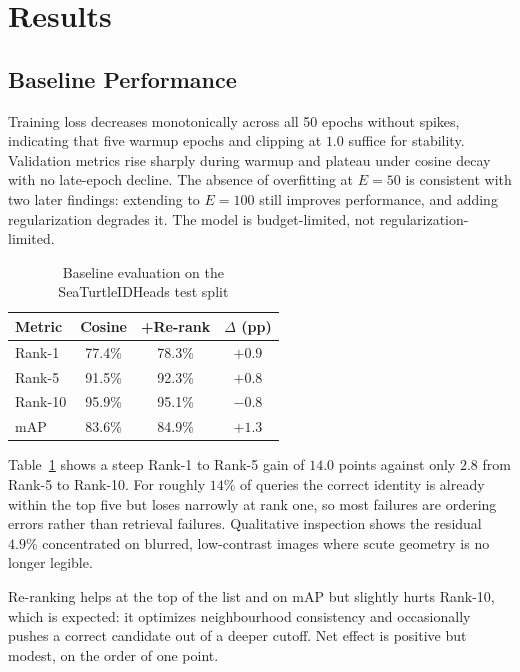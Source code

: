 \documentclass[conference]{IEEEtran}
\begin{document}
\section{Results}

\subsection{Baseline Performance}

Training loss decreases monotonically across all 50 epochs without spikes, indicating
that five warmup epochs and clipping at $1.0$ suffice for stability. Validation metrics
rise sharply during warmup and plateau under cosine decay with no late-epoch decline.
The absence of overfitting at $E=50$ is consistent with two later findings: extending
to $E=100$ still improves performance, and adding regularization degrades it. The model
is budget-limited, not regularization-limited.

\begin{table}[t]
  \caption{Baseline evaluation on the SeaTurtleIDHeads test split}
  \label{tab:baseline_res}
  \centering
  \footnotesize
  \begin{tabular}{@{}lccc@{}}
    \toprule
    \textbf{Metric} & \textbf{Cosine} & \textbf{+Re-rank} & $\Delta$ (pp) \\
    \midrule
    Rank-1          & 77.4\%          & 78.3\%            & $+0.9$        \\
    Rank-5          & 91.5\%          & 92.3\%            & $+0.8$        \\
    Rank-10         & 95.9\%          & 95.1\%            & $-0.8$        \\
    mAP             & 83.6\%          & 84.9\%            & $+1.3$        \\
    \bottomrule
  \end{tabular}
\end{table}

Table~\ref{tab:baseline_res} shows a steep Rank-1 to Rank-5 gain of $14.0$ points
against only $2.8$ from Rank-5 to Rank-10. For roughly $14\%$ of queries the correct
identity is already within the top five but loses narrowly at rank one, so most failures
are ordering errors rather than retrieval failures. Qualitative inspection shows the
residual $4.9\%$ concentrated on blurred, low-contrast images where scute geometry is no
longer legible.

Re-ranking helps at the top of the list and on mAP but slightly hurts Rank-10, which is
expected: it optimizes neighbourhood consistency and occasionally pushes a correct
candidate out of a deeper cutoff. Net effect is positive but modest, on the order of one
point.
\end{document}

